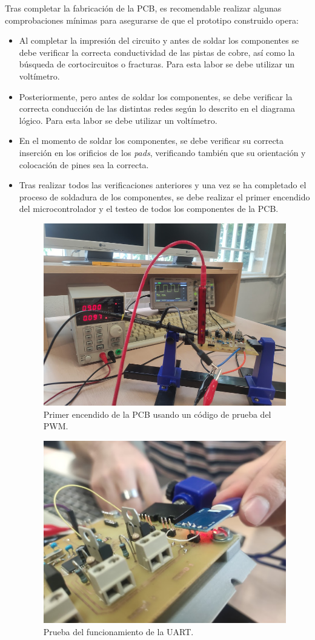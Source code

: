 Tras completar la fabricación de la \ac{PCB}, es recomendable realizar algunas comprobaciones mínimas para asegurarse de que el prototipo construido opera:

\begin{itemize}
    \item Al completar la impresión del circuito y antes de soldar los componentes se debe verificar la correcta conductividad de las pistas de cobre, así como la búsqueda de cortocircuitos o fracturas. Para esta labor se debe utilizar un voltímetro.
    
    \item Posteriormente, pero antes de soldar los componentes, se debe verificar la correcta conducción de las distintas redes según lo descrito en el diagrama lógico. Para esta labor se debe utilizar un voltímetro.
    
    \item En el momento de soldar los componentes, se debe verificar su correcta inserción en los orificios de los \textit{pads}, verificando también que su orientación y colocación de pines sea la correcta.
    
    \item Tras realizar todos las verificaciones anteriores y una vez se ha completado el proceso de soldadura de los componentes, se debe realizar el primer encendido del microcontrolador y el testeo de todos los componentes de la \ac{PCB}.
        
    \begin{figure}[H]
    \centering 
    \includegraphics[width=0.55\linewidth]{pictures/PrimerEncendido.jpg}
    \caption{Primer encendido de la \ac{PCB} usando un código de prueba del PWM.}
    \end{figure}
    
    \begin{figure}[H]
    \centering 
    \includegraphics[width=0.55\linewidth]{pictures/PruebaUart}
    \caption{Prueba del funcionamiento de la UART.}
    \end{figure}
    

\end{itemize}
